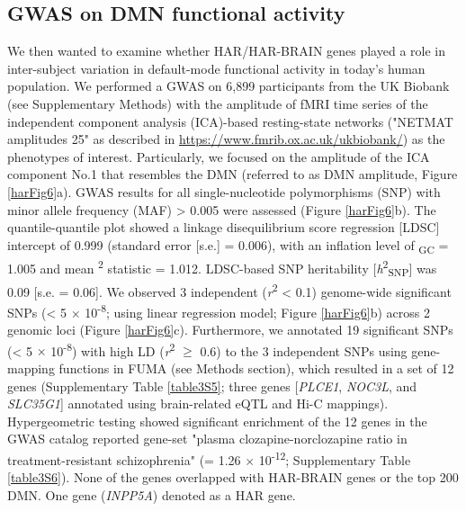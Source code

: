 \begin{refsection}
\subsection*{GWAS on DMN functional activity}
We then wanted to examine whether HAR/HAR-BRAIN genes played a role in inter-subject variation in default-mode functional activity in today's human population. We performed a GWAS on 6,899 participants from the UK Biobank \citep{sudlow2015uk} (see Supplementary Methods) with the amplitude of fMRI time series of the independent component analysis (ICA)-based resting-state networks ("NETMAT amplitudes 25"\citep{elliott2018genome} as described in \url{https://www.fmrib.ox.ac.uk/ukbiobank/}) as the phenotypes of interest. Particularly, we focused on the amplitude of the ICA component No.1 that resembles the DMN (referred to as DMN amplitude, Figure \ref{harFig6}a). GWAS results for all single-nucleotide polymorphisms (SNP) with minor allele frequency (MAF) > 0.005 were assessed (Figure \ref{harFig6}b). The quantile-quantile plot showed a linkage disequilibrium score regression [LDSC] intercept of 0.999 (standard error [s.e.] = 0.006), with an inflation level of \textlambda\textsubscript{GC} = 1.005 and mean \textchi\textsuperscript{2} statistic = 1.012. LDSC-based SNP heritability [\textit{h}\textsuperscript{2}\textsubscript{SNP}] was 0.09 [s.e. = 0.06]. We observed 3 independent (\textit{r}\textsuperscript{2} < 0.1) genome-wide significant SNPs (\pval < 5 $\times$ 10\textsuperscript{-8}; using linear regression model; Figure \ref{harFig6}b) across 2 genomic loci (Figure \ref{harFig6}c). Furthermore, we annotated 19 significant SNPs (\pval < 5 $\times$ 10\textsuperscript{-8}) with high LD (\textit{r}\textsuperscript{2} $\geq$ 0.6) to the 3 independent SNPs using gene-mapping functions in FUMA \citep{watanabe2017functional} (see Methods section), which resulted in a set of 12 genes (Supplementary Table \ref{table3S5}; three genes [\textit{PLCE1}, \textit{NOC3L}, and \textit{SLC35G1}] annotated using brain-related eQTL and Hi-C mappings). Hypergeometric testing \citep{watanabe2017functional} showed significant enrichment of the 12 genes in the GWAS catalog \citep{buniello2018nhgri} reported gene-set "plasma clozapine-norclozapine ratio in treatment-resistant schizophrenia" (\pval = 1.26 $\times$ 10\textsuperscript{-12}; Supplementary Table \ref{table3S6}). None of the genes overlapped with HAR-BRAIN genes or the top 200 DMN. One gene (\textit{INPP5A}) denoted as a HAR gene.


\end{refsection}
